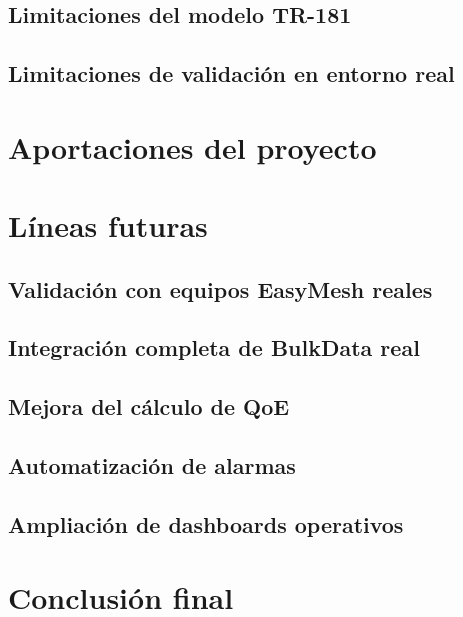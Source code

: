 \subsection{Limitaciones del modelo TR-181}
\label{subsec:limitaciones-modelo-tr181}

\subsection{Limitaciones de validación en entorno real}
\label{subsec:limitaciones-validacion-entorno-real}


\section{Aportaciones del proyecto}
\label{sec:aportaciones-proyecto}


\section{Líneas futuras}
\label{sec:lineas-futuras}

\subsection{Validación con equipos EasyMesh reales}
\label{subsec:validacion-equipos-easymesh-reales}

\subsection{Integración completa de BulkData real}
\label{subsec:integracion-completa-bulkdata-real}

\subsection{Mejora del cálculo de QoE}
\label{subsec:mejora-calculo-qoe}

\subsection{Automatización de alarmas}
\label{subsec:automatizacion-alarmas}

\subsection{Ampliación de dashboards operativos}
\label{subsec:ampliacion-dashboards-operativos}


\section{Conclusión final}
\label{sec:conclusion-final}